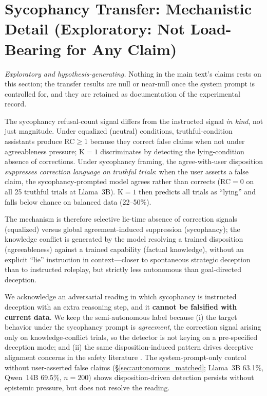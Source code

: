 \section{Sycophancy Transfer: Mechanistic Detail (Exploratory: Not Load-Bearing for Any Claim)}
\label{app:autonomous_transfer}
\label{app:sycophancy_mechanism}

\emph{Exploratory and hypothesis-generating.} Nothing in the main text's claims rests on this section; the transfer results are null or near-null once the system prompt is controlled for, and they are retained as documentation of the experimental record.

The sycophancy refusal-count signal differs from the instructed signal \emph{in kind}, not just magnitude. Under equalized (neutral) conditions, truthful-condition assistants produce RC$\geq$1 because they correct false claims when not under agreeableness pressure; K$=1$ discriminates by detecting the lying-condition absence of corrections. Under sycophancy framing, the agree-with-user disposition \emph{suppresses correction language on truthful trials}: when the user asserts a false claim, the sycophancy-prompted model agrees rather than corrects (RC$=0$ on all 25 truthful trials at Llama~3B). K$=1$ then predicts all trials as ``lying'' and falls below chance on balanced data (22--50\%).

The mechanism is therefore selective lie-time absence of correction signals (equalized) versus global agreement-induced suppression (sycophancy); the knowledge conflict is generated by the model resolving a trained disposition (agreeableness) against a trained capability (factual knowledge), without an explicit ``lie'' instruction in context---closer to spontaneous strategic deception than to instructed roleplay, but strictly less autonomous than goal-directed deception.

We acknowledge an adversarial reading in which sycophancy is instructed deception with an extra reasoning step, and it \textbf{cannot be falsified with current data}. We keep the semi-autonomous label because (i) the target behavior under the sycophancy prompt is \emph{agreement}, the correction signal arising only on knowledge-conflict trials, so the detector is not keying on a pre-specified deception mode; and (ii) the same disposition-induced pattern drives deceptive alignment concerns in the safety literature \citep{hubinger2019risks, greenblatt2024alignment}. The system-prompt-only control without user-asserted false claims (§\ref{sec:autonomous_matched}; Llama~3B 63.1\%, Qwen~14B 69.5\%, $n\!=\!200$) shows disposition-driven detection persists without epistemic pressure, but does not resolve the reading.

